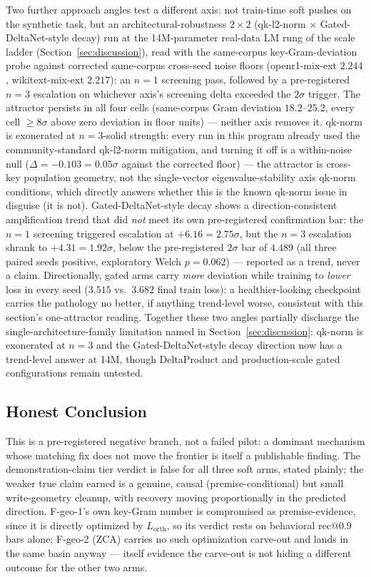 Two further approach angles test a different axis: not train-time soft
pushes on the synthetic task, but an architectural-robustness
$2\times2$ (qk-l2-norm $\times$ Gated-DeltaNet-style decay) run at the
14M-parameter real-data LM rung of the scale ladder
(Section~\ref{sec:discussion}), read with the same-corpus key-Gram-deviation
probe against corrected same-corpus cross-seed noise floors
(openr1-mix-ext $2.244$, wikitext-mix-ext $2.217$): an $n{=}1$ screening
pass, followed by a pre-registered $n{=}3$ escalation on whichever axis's
screening delta exceeded the $2\sigma$ trigger. The attractor persists in
all four cells (same-corpus Gram deviation $18.2$--$25.2$, every cell
$\geq8\sigma$ above zero deviation in floor units) --- neither axis
removes it. qk-norm is exonerated at $n{=}3$-solid strength: every run in
this program already used the community-standard qk-l2-norm mitigation,
and turning it off is a within-noise null ($\Delta{=}{-}0.103{=}0.05\sigma$
against the corrected floor) --- the attractor is cross-key population
geometry, not the single-vector eigenvalue-stability axis qk-norm
conditions, which directly answers whether this is the known qk-norm
issue in disguise (it is not). Gated-DeltaNet-style decay shows a
direction-consistent amplification trend that did \emph{not} meet its own
pre-registered confirmation bar: the $n{=}1$ screening triggered escalation
at $+6.16{=}2.75\sigma$, but the $n{=}3$ escalation shrank to
$+4.31{=}1.92\sigma$, below the pre-registered $2\sigma$ bar of $4.489$
(all three paired seeds positive, exploratory Welch $p{=}0.062$) ---
reported as a trend, never a claim. Directionally, gated arms carry
\emph{more} deviation while training to \emph{lower} loss in every seed
($3.515$ vs.\ $3.682$ final train loss): a healthier-looking checkpoint
carries the pathology no better, if anything trend-level worse,
consistent with this section's one-attractor reading. Together these two
angles partially discharge the single-architecture-family limitation
named in Section~\ref{sec:discussion}: qk-norm is exonerated at $n{=}3$
and the Gated-DeltaNet-style decay direction now has a trend-level
answer at 14M, though DeltaProduct and production-scale gated
configurations remain untested.

\subsection{Honest Conclusion}

This is a pre-registered negative branch, not a failed pilot: a dominant
mechanism whose matching fix does not move the frontier is itself a
publishable finding. The demonstration-claim tier verdict is false for
all three soft arms, stated plainly; the weaker true claim earned is a
genuine, causal (premise-conditional) but small write-geometry cleanup,
with recovery moving proportionally in the predicted direction.
F-geo-1's own key-Gram number is compromised as premise-evidence, since
it is directly optimized by $L_{\mathrm{orth}}$, so its verdict rests on
behavioral $\mathrm{rec@0.9}$ bars alone; F-geo-2 (ZCA) carries no such
optimization carve-out and lands in the same basin anyway --- itself
evidence the carve-out is not hiding a different outcome for the other
two arms.
